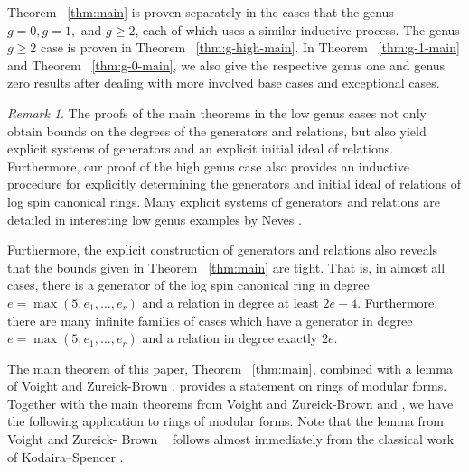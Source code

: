 \documentclass{amsart}
\theoremstyle{plain}
\theoremstyle{definition}
\theoremstyle{remark}
\newtheorem{rem}[thm]{Remark}
\numberwithin{equation}{section}
\begin{document}
Theorem ~\ref{thm:main} is proven separately in the cases that the genus $g = 0, g = 1,$ and $g \geq 2$, each of
which uses a similar inductive process. The genus $g \geq 2$ case is
proven in Theorem ~\ref{thm:g-high-main}. In Theorem
~\ref{thm:g-1-main} and Theorem
~\ref{thm:g-0-main}, we also give the respective
genus one and genus zero results after dealing with more involved base cases and
exceptional cases.

\begin{rem}
\label{rem:explicit-generators}
The proofs of the main theorems in the low genus cases not only
obtain bounds on the degrees of the generators and relations, but
also yield explicit systems of generators and an explicit initial ideal of
relations. Furthermore, our proof of the high genus case also
provides an inductive procedure for explicitly determining the 
generators and initial ideal of relations of log spin canonical
rings. Many explicit systems of generators and relations are
detailed in interesting low genus examples by Neves
\cite[Section III.4]{neves:halfcan}.

Furthermore, the explicit construction of generators and relations also reveals that the bounds given in Theorem ~\ref{thm:main} are tight. That is, in almost all cases, there is a generator of the log spin canonical ring in degree $e = \max(5, e_1, \ldots, e_r)$ and a relation in degree at least $2e-4$. Furthermore, there are many infinite families of cases which have a generator in degree $e = \max(5, e_1, \ldots, e_r)$ and a relation in degree exactly $2e$.
\end{rem}

The main theorem of this paper, Theorem ~\ref{thm:main}, combined
with a lemma of Voight and Zureick-Brown \cite[Lemma 10.2.1]
{vzb:stacky}, provides a statement on rings of modular forms.
Together with the main theorems from Voight and Zureick-Brown \cite
[Theorem 9.3.1]{vzb:stacky} and \cite
[Theorem 9.3.1]{vzb:stacky}, we have the following application to
rings of modular forms. Note that the lemma from Voight and Zureick-
Brown ~\cite[Lemma 10.2.1]{vzb:stacky} follows almost immediately
from the classical work of Kodaira--Spencer
\cite{kodaira-spencer:deformations}.
\end{document}
